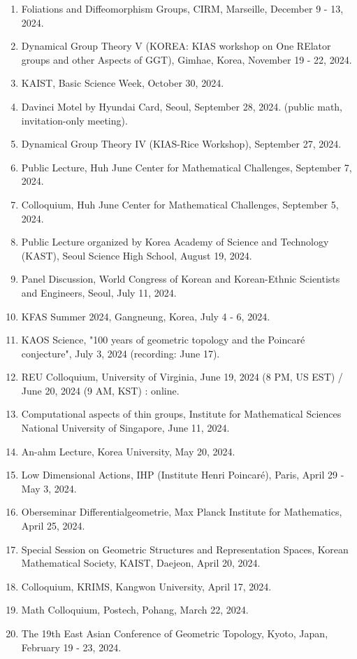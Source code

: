 \documentclass[11pt,a4paper]{article}
\begin{document}
\begin{enumerate}[leftmargin=1.5em, label=\arabic*.]
\item Foliations and Diffeomorphism Groups, CIRM, Marseille, December 9 - 13, 2024.
\item Dynamical Group Theory V (KOREA: KIAS workshop on One RElator groups and other Aspects of GGT), Gimhae, Korea, November 19 - 22, 2024.
\item KAIST, Basic Science Week, October 30, 2024.
\item Davinci Motel by Hyundai Card, Seoul, September 28, 2024. (public math, invitation-only meeting).
\item Dynamical Group Theory IV (KIAS-Rice Workshop), September 27, 2024.
\item Public Lecture, Huh June Center for Mathematical Challenges, September 7, 2024.
\item Colloquium, Huh June Center for Mathematical Challenges, September 5, 2024.
\item Public Lecture organized by Korea Academy of Science and Technology (KAST), Seoul Science High School, August 19, 2024.
\item Panel Discussion, World Congress of Korean and Korean-Ethnic Scientists and Engineers, Seoul, July 11, 2024.
\item KFAS Summer 2024, Gangneung, Korea, July 4 - 6, 2024.
\item KAOS Science, "100 years of geometric topology and the Poincaré conjecture", July 3, 2024 (recording: June 17).
\item REU Colloquium, University of Virginia, June 19, 2024 (8 PM, US EST) / June 20, 2024 (9 AM, KST) : online.
\item Computational aspects of thin groups, Institute for Mathematical Sciences National University of Singapore, June 11, 2024.
\item An-ahm Lecture, Korea University, May 20, 2024.
\item Low Dimensional Actions, IHP (Institute Henri Poincaré), Paris, April 29 - May 3, 2024.
\item Oberseminar Differentialgeometrie, Max Planck Institute for Mathematics, April 25, 2024.
\item Special Session on Geometric Structures and Representation Spaces, Korean Mathematical Society, KAIST, Daejeon, April 20, 2024.
\item Colloquium, KRIMS, Kangwon University, April 17, 2024.
\item Math Colloquium, Postech, Pohang, March 22, 2024.
\item The 19th East Asian Conference of Geometric Topology, Kyoto, Japan, February 19 - 23, 2024.

\end{enumerate}
\end{document}
